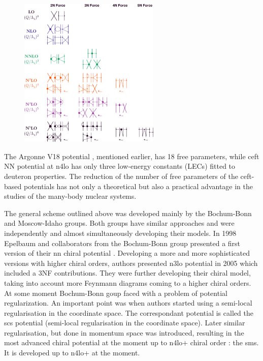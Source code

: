 \begin{figure}[h]
    \begin{center}
    \includegraphics[width=0.6\textwidth]{Figures/chiral.png}
    \end{center}
    \caption{}
    \label{chiral_diagrams}
\end{figure}

The Argonne V18 potential \cite{AV18Wiringa}, mentioned earlier, has 18 free parameters,
while \gls{ceft} NN potential at \gls{n4lo} \cite{Machleidt2011} has only three low-energy constants (LECs) fitted to deuteron properties.
The reduction of the number of free parameters of the \gls{ceft}-based potentials
has not only a theoretical but also a practical advantage in the studies of the many-body nuclear systems.

The general scheme outlined above was developed mainly by the Bochum-Bonn and Moscow-Idaho groups.
Both groups have similar approaches and were independently and almost simultaneously
developing their models. In 1998 Epelbaum and collaborators from the Bochum-Bonn group 
presented a first version of their \gls{nn} chiral potential \cite{EPELBAOUM1998107, epelbaum2000two}.
Developing a more and more sophisticated versions with higher chiral orders, authors presented
\gls{n3lo} potential in 2005 \cite{epelbaum2005two} which included a 3NF contributions.
They were further developing their chiral model, taking into account more Feynmann diagrams
coming to a higher chiral orders.
At some moment Bochum-Bonn goup faced with a problem of potential regularization\cite{skibiki_wita}.
An important point was when authors started using a semi-local regularisation 
in the coordinate space. The correspondant potential is called  the \gls{scs} potential
(semi-local regularisation in the coordinate space)\cite{Epelbaum2014SCS}. Later similar regularisation,
but done in momentum space was introduced, resulting in the most advanced chiral potential at the moment up to  
\gls{n4lo+} chiral order \cite{reinkrebs2018}: the \gls{sms}. It is developed up to \gls{n4lo+} at the moment.


